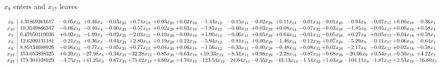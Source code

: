 \documentclass[9pt]{article}
\begin{document}
 $ x_{8} $ enters and $ x_{17} $ leaves 

 \[\begin{array}{c| c c@{\hskip 2pt} c@{\hskip 2pt} c@{\hskip 2pt} c@{\hskip 2pt} c@{\hskip 2pt} c@{\hskip 2pt} c@{\hskip 2pt} c@{\hskip 2pt} c@{\hskip 2pt} c@{\hskip 2pt} c@{\hskip 2pt} c@{\hskip 2pt} c@{\hskip 2pt} c@{\hskip 2pt} c@{\hskip 2pt} c@{\hskip 2pt} }
 x_{8}   &  4.31869261617 & -0.05 x_{31} & +  0.46 x_{4} & -0.03 x_{25} & +  0.74 x_{13} & +  0.03 x_{20} & +  0.02 x_{19} & -1.43 x_{12} & -0.15 x_{11} & -0.02 x_{29} & +  0.11 x_{14} & -0.01 x_{32} & -0.01 x_{26} & -0.94 x_{9} & -0.07 x_{17} & +  0.00 x_{18} & -0.36 x_{1}\\
 x_{10}   &  10.3549866347 & -0.06 x_{31} & -0.40 x_{4} & -0.00 x_{25} & -0.57 x_{13} & +  0.02 x_{20} & +  0.03 x_{19} & -1.85 x_{12} & -0.60 x_{11} & +  0.03 x_{29} & +  0.08 x_{14} & -0.07 x_{32} & -0.03 x_{26} & -1.85 x_{9} & -0.05 x_{17} & +  0.00 x_{18} & +  0.58 x_{1}\\
 x_{7}   &  6.47050119036 & +  0.02 x_{31} & -1.99 x_{4} & -0.02 x_{25} & -2.03 x_{13} & -0.10 x_{20} & -0.09 x_{19} & +  1.90 x_{12} & -0.06 x_{11} & +  0.05 x_{29} & +  0.64 x_{14} & -0.01 x_{32} & -0.05 x_{26} & +  0.27 x_{9} & +  0.05 x_{17} & -0.04 x_{18} & +  0.59 x_{1}\\
 x_{5}   &  12.6209131181 & -0.21 x_{31} & +  0.36 x_{4} & -0.04 x_{25} & +  2.80 x_{13} & +  0.19 x_{20} & +  0.22 x_{19} & -5.94 x_{12} & -0.81 x_{11} & +  0.00 x_{29} & -1.46 x_{14} & -0.12 x_{32} & +  0.07 x_{26} & -5.29 x_{9} & -0.11 x_{17} & +  0.06 x_{18} & -0.64 x_{1}\\
 x_{6}   &  8.85134698926 & -0.06 x_{31} & -0.77 x_{4} & -0.05 x_{25} & +  0.77 x_{13} & +  0.04 x_{20} & +  0.06 x_{19} & -1.56 x_{12} & -0.33 x_{11} & -0.00 x_{29} & -0.48 x_{14} & -0.08 x_{32} & +  0.02 x_{26} & -2.17 x_{9} & -0.02 x_{17} & +  0.02 x_{18} & -0.58 x_{1}\\
 x_{22}   &  153.053898325 & +  0.20 x_{31} & -27.98 x_{4} & -0.34 x_{25} & -32.28 x_{13} & -0.85 x_{20} & -0.63 x_{19} & + 19.33 x_{12} & -8.31 x_{11} & +  0.98 x_{29} & -2.28 x_{14} & -0.87 x_{32} & -0.68 x_{26} & -20.06 x_{9} & +  0.54 x_{17} & -0.30 x_{18} & +  4.22 x_{1}\\
 x_{23}   &  173.304108929 & -3.75 x_{31} & + 41.25 x_{4} & -0.67 x_{25} & + 75.02 x_{13} & +  4.60 x_{20} & +  4.70 x_{19} & -123.54 x_{12} & -24.64 x_{11} & -0.55 x_{29} & -43.13 x_{14} & -1.54 x_{32} & +  1.63 x_{26} & -104.11 x_{9} & -1.81 x_{17} & +  2.53 x_{18} & -16.60 x_{1}\\

\end{array}\]
\end{document}
